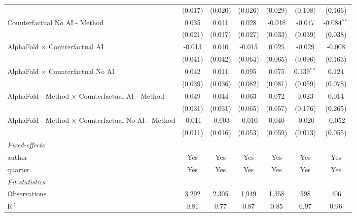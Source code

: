 \begin{tabular}{lcccccc}
                                                              & (0.017) & (0.020) & (0.026) & (0.029) & (0.108)      & (0.166)\\   
   Counterfactual No AI - Method                              & 0.035   & 0.011   & 0.028   & -0.018  & -0.047       & -0.084$^{**}$\\   
                                                              & (0.021) & (0.017) & (0.027) & (0.033) & (0.039)      & (0.038)\\   
   AlphaFold $\times$ Counterfactual AI                       & -0.013  & 0.010   & -0.015  & 0.025   & -0.029       & -0.008\\   
                                                              & (0.041) & (0.042) & (0.064) & (0.065) & (0.096)      & (0.163)\\   
   AlphaFold $\times$ Counterfactual No AI                    & 0.042   & 0.011   & 0.095   & 0.075   & 0.139$^{**}$ & 0.124\\   
                                                              & (0.039) & (0.036) & (0.082) & (0.081) & (0.059)      & (0.078)\\   
   AlphaFold - Method $\times$ Counterfactual AI - Method     & 0.049   & 0.044   & 0.063   & 0.072   & 0.023        & 0.014\\   
                                                              & (0.031) & (0.031) & (0.065) & (0.057) & (0.176)      & (0.265)\\   
   AlphaFold - Method $\times$ Counterfactual No AI - Method  & -0.011  & -0.003  & -0.010  & 0.040   & -0.020       & -0.052\\   
                                                              & (0.011) & (0.016) & (0.053) & (0.059) & (0.013)      & (0.055)\\   
   \midrule
   \emph{Fixed-effects}\\
   author                                                     & Yes     & Yes     & Yes     & Yes     & Yes          & Yes\\  
   quarter                                                    & Yes     & Yes     & Yes     & Yes     & Yes          & Yes\\  
   \midrule
   \emph{Fit statistics}\\
   Observations                                               & 3,292   & 2,305   & 1,949   & 1,358   & 598          & 406\\  
   R$^2$                                                      & 0.81    & 0.77    & 0.87    & 0.85    & 0.97         & 0.96\\  

\end{tabular}
